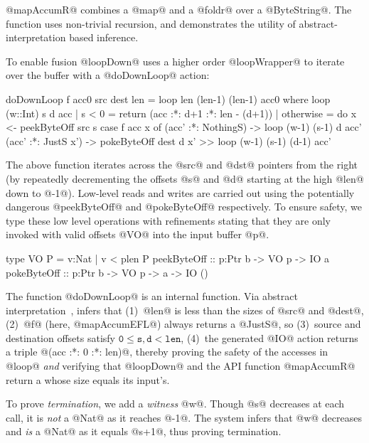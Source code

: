 @mapAccumR@ combines a @map@ and a @foldr@ over a @ByteString@. 
The function uses non-trivial recursion, and demonstrates 
the utility of abstract-interpretation based inference. 
%
%
To enable fusion \cite{streamfusion} 
@loopDown@ uses a higher order @loopWrapper@ 
to iterate over the buffer with a @doDownLoop@ action:
%
\begin{code}
doDownLoop f acc0 src dest len 
  = loop len (len-1) (len-1) acc0
  where
   loop (w::Int) s d acc
     | s < 0 
     = return (acc :*: d+1 :*: len - (d+1))
     | otherwise       
     = do x <- peekByteOff src s
          case f acc x of
            (acc' :*: NothingS) -> 
                 loop (w-1) (s-1) d acc'
            (acc' :*: JustS x') -> 
                 pokeByteOff dest d x'
              >> loop (w-1) (s-1) (d-1) acc'
\end{code}

The above function iterates across the @src@ and @dst@ 
pointers from the right (by repeatedly decrementing the 
offsets @s@ and @d@ starting at the high @len@ down to @-1@). 
Low-level reads and writes are carried out using the 
potentially dangerous @peekByteOff@ and @pokeByteOff@ 
respectively. To ensure safety, we type these low level 
operations with refinements stating that they are only 
invoked with valid offsets @VO@ into the input buffer @p@.

\begin{code}
type VO P    = {v:Nat | v < plen P}
peekByteOff :: p:Ptr b -> VO p -> IO a
pokeByteOff :: p:Ptr b -> VO p -> a -> IO ()
\end{code}

The function @doDownLoop@ is an internal function.
Via abstract interpretation~\cite{LiquidPLDI08}, 
\toolname infers that
%
(1)~@len@ is less than the sizes of @src@ and @dest@,
(2)~@f@ (here, @mapAccumEFL@) always returns a @JustS@, so
(3)~source and destination offsets satisfy $$,
(4)~the generated @IO@ action returns a triple @(acc :*: 0 :*: len)@,
%
thereby proving the safety of the accesses in @loop@ \emph{and}
verifying that @loopDown@ and the API function @mapAccumR@ 
return a \bytestring whose size equals its input's.
 
To prove \emph{termination}, we add a \emph{witness} @w@.
Though @s@ decreases at each call, it is \emph{not} a @Nat@ 
as it reaches @-1@. 
The system infers that @w@ decreases and \emph{is} a @Nat@
as it equals @s+1@, thus proving termination.

